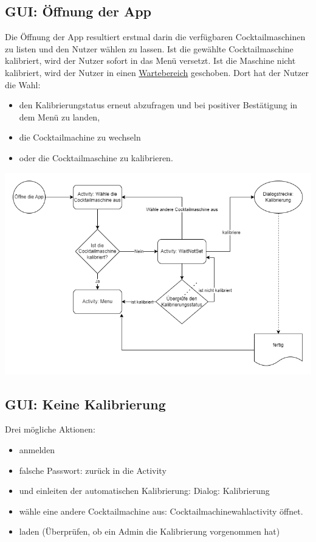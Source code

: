 {\subsection{GUI: Öffnung der App}
Die Öffnung der App resultiert erstmal darin die verfügbaren Cocktailmaschinen zu listen und den Nutzer wählen zu lassen. Ist die gewählte Cocktailmaschine kalibriert, wird der Nutzer sofort in das Menü versetzt. Ist die Maschine nicht kalibriert, wird der Nutzer in einen \hyperref[subsec:nocal]{Wartebereich} geschoben. Dort hat der Nutzer die Wahl:
\begin{itemize}
	\item den Kalibrierungstatus erneut abzufragen und bei positiver Bestätigung in dem Menü zu landen, 
	\item die Cocktailmachine zu wechseln
	\item oder die Cocktailmaschine zu kalibrieren.
\end{itemize}
\includegraphics[scale=0.40]{Appstart.png}


\subsection{GUI: Keine Kalibrierung}
\label{subsec:nocal}

Drei mögliche Aktionen:

\begin{itemize}
\item anmelden
\item falsche Passwort: zurück in die Activity
\item und einleiten der automatischen Kalibrierung: Dialog: Kalibrierung
\item wähle eine andere Cocktailmachine aus: Cocktailmachinewahlactivity öffnet.
\item laden (Überprüfen, ob ein Admin die Kalibrierung vorgenommen hat)
\begin{itemize}


\end{itemize}
\end{itemize}}
